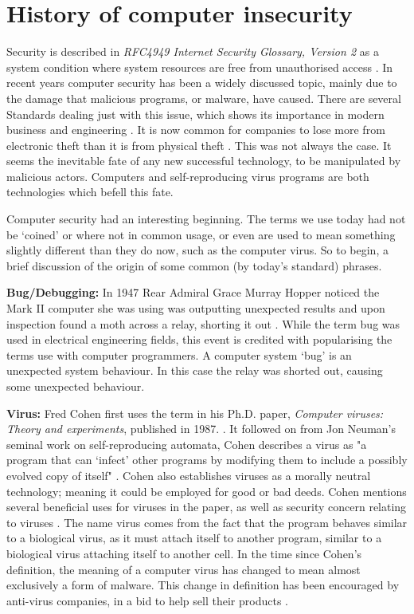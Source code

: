 \section{History of computer insecurity}
\label{History of computer insecurity}
Security is described in \textit{RFC4949 Internet Security Glossary, Version 2} as a system condition where system resources are free from unauthorised access 
\cite{RN66}. In recent years computer security has been a widely discussed topic, mainly due to the damage that malicious programs, or malware, have caused. There are several Standards dealing just with this issue, which shows its importance in modern business and engineering 
\cite{RN70}\cite{RN68}\cite{RN69}. It is now common for companies to lose more from electronic theft than it is from physical theft 
\cite{RN76}. This was not always the case. It seems the inevitable fate of any new successful technology, to be manipulated by malicious actors. Computers and self-reproducing virus programs are both technologies which befell this fate.

Computer security had an interesting beginning. The terms we use today had not be ‘coined’ or where not in common usage, or even are used to mean something slightly different than they do now, such as the computer virus. So to begin, a brief discussion of the origin of some common (by today's standard) phrases.

\textbf{Bug/Debugging:} In 1947 Rear Admiral Grace Murray Hopper noticed the Mark II computer she was using was outputting unexpected results and upon inspection found a moth across a relay, shorting it out 
\cite{RN75}. While the term bug was used in electrical engineering fields, this event is credited with popularising the terms use with computer programmers. A computer system ‘bug’ is an unexpected system behaviour. In this case the relay was shorted out, causing some unexpected behaviour. 

\textbf{Virus:} Fred Cohen first uses the term in his Ph.D. paper, \textit{Computer viruses: Theory and experiments}, published in 1987. 
\cite{RN61}. It followed on from Jon Neuman’s seminal work on self-reproducing automata, Cohen describes a virus as "a program that can ‘infect’ other programs by modifying them to include a possibly evolved copy of itself" \cite{RN61}. Cohen also establishes viruses as a morally neutral technology; meaning it could be employed for good or bad deeds. Cohen mentions several beneficial uses for viruses in the paper, as well as security concern relating to viruses \cite{RN61}. The name virus comes from the fact that the program behaves similar to a biological virus, as it must attach itself to another program, similar to a biological virus attaching itself to another cell. In the time since Cohen's definition, the meaning of a computer virus has changed to mean almost exclusively a form of malware. This change in definition has been encouraged by anti-virus companies, in a bid to help sell their products 
\cite{RN64}. 

